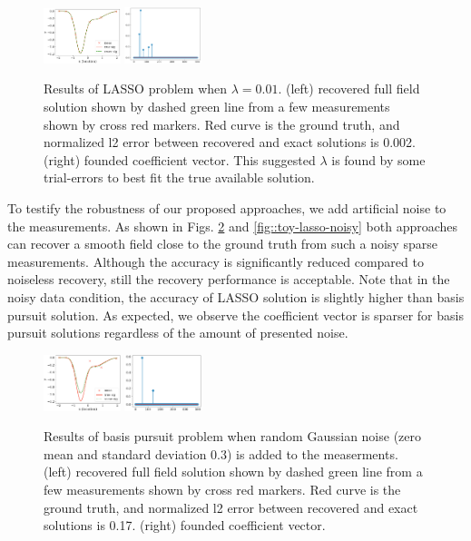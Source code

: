 \documentclass[conference]{IEEEtran}
\begin{document}
\begin{figure}[!ht]
  \centering
  \includegraphics[width=0.2\textwidth]{figure/toy_lasso_sol.png}
  \hspace{0.01\textwidth}
  \includegraphics[width=0.2\textwidth]{figure/toy_lasso_coeff.png}
  \caption{Results of LASSO problem when $\lambda=0.01$. (left) recovered full field solution shown by dashed green line from a few measurements shown by cross red markers. Red curve is the ground truth, and normalized l2 error between recovered and exact solutions is 0.002. (right) founded coefficient vector. This suggested $\lambda$ is found by some trial-errors to best fit the true available solution.}\label{fig::toy-lasso}
\end{figure}

To testify the robustness of our proposed approaches, we add artificial noise to the measurements. As shown in Figs. \ref{fig::toy-l1-noisy} and \ref{fig::toy-lasso-noisy} both  approaches can recover a smooth field close to the ground truth from such a noisy sparse measurements. Although the accuracy is significantly reduced compared to noiseless recovery, still the recovery performance is acceptable. Note that in the noisy data condition, the accuracy of LASSO solution is slightly higher than basis pursuit solution. As expected, we observe the coefficient vector is sparser for basis pursuit solutions regardless of the amount of presented noise.

\begin{figure}[!ht]
  \centering
  \includegraphics[width=0.2\textwidth]{figure/toy_l1_sol_noisy.png}
  \hspace{0.01\textwidth}
  \includegraphics[width=0.2\textwidth]{figure/toy_l1_coeff_noisy.png}
  \caption{Results of basis pursuit problem when random Gaussian noise (zero mean and standard deviation 0.3) is added to the measerments. (left) recovered full field solution shown by dashed green line from a few measurements shown by cross red markers. Red curve is the ground truth, and normalized l2 error between recovered and exact solutions is 0.17. (right) founded coefficient vector.}\label{fig::toy-l1-noisy}
\end{figure}
\end{document}
